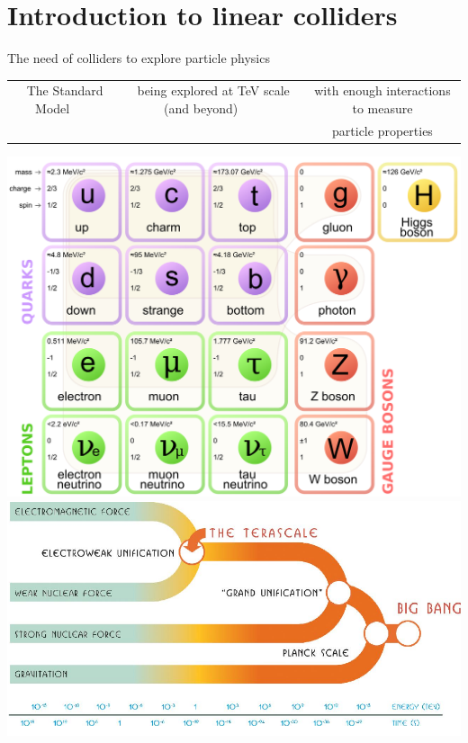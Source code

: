 \documentclass{beamer}
\begin{document}
\section{Introduction to linear colliders}
\begin{frame}{The need of colliders to explore particle physics}\,
 {\tiny  \hspace*{0.6cm}
 \begin{tabular}{ccc}
  The Standard Model$\qquad$& being explored at TeV scale (and beyond)$\qquad$ & with enough interactions to measure\\
  &&particle properties
 \end{tabular}
}
 \includegraphics[scale=0.04]{Standard_Model_of_Elementary_Particles.jpg}\hspace*{0.6cm}
 \includegraphics[scale=0.26]{energyforce.pdf}\hspace*{0.6cm}

\end{frame}
\end{document}
